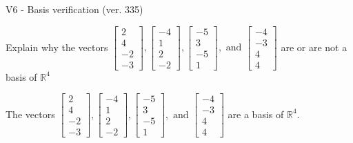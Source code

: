 \begin{exercise}
  \begin{exerciseTitle}V6 - Basis verification (ver. 335)\end{exerciseTitle}
  \begin{exerciseStatement}
    Explain why the vectors \(\left[\begin{array}{r}
2 \\
4 \\
-2 \\
-3
\end{array}\right] , \left[\begin{array}{r}
-4 \\
1 \\
2 \\
-2
\end{array}\right] , \left[\begin{array}{r}
-5 \\
3 \\
-5 \\
1
\end{array}\right] , \text{ and } \left[\begin{array}{r}
-4 \\
-3 \\
4 \\
4
\end{array}\right]\) are or are not a basis of \(\mathbb{R}^4\)	


  \end{exerciseStatement}
  \begin{exerciseAnswer}
   The vectors \(\left[\begin{array}{r}
2 \\
4 \\
-2 \\
-3
\end{array}\right] , \left[\begin{array}{r}
-4 \\
1 \\
2 \\
-2
\end{array}\right] , \left[\begin{array}{r}
-5 \\
3 \\
-5 \\
1
\end{array}\right] , \text{ and } \left[\begin{array}{r}
-4 \\
-3 \\
4 \\
4
\end{array}\right]\) 
  	 are  a basis of \(\mathbb{R}^4\).
  


  \end{exerciseAnswer}
\end{exercise}